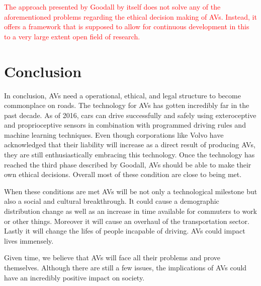\documentclass[11pt]{article}
\newcommand{\changed}[1]{\textcolor{red}{#1}}
\begin{document}
\changed{The approach presented by Goodall by itself does not solve any of the aforementioned problems regarding the ethical decision making of AVs. Instead, it offers a framework that is supposed to allow for continuous development in this to a very large extent open field of research. }

\section{Conclusion}
In conclusion, AVs need a operational, ethical, and legal structure to become commonplace on roads. The technology for AVs has gotten incredibly far in the past decade. As of 2016, cars can drive successfully and safely using exteroceptive and proprioceptive sensors in combination with programmed driving rules and machine learning techniques. Even though corporations like Volvo have acknowledged that their liability will increase as a direct result of producing AVs, they are still enthusiastically embracing this technology. Once the technology has reached the third phase described by Goodall, AVs should be able to make their own ethical decisions. Overall most of these condition are close to being met. 

When these conditions are met AVs will be not only a technological milestone but also a social and cultural breakthrough. It could cause a demographic distribution change as well as an increase in time available for commuters to work or other things. Moreover it will cause an overhaul of the transportation sector. Lastly it will change the lifes of people incapable of driving. AVs could impact lives immensely. 

Given time, we believe that AVs will face all their problems and prove themselves. Although there are still a few issues, the implications of AVs could have an incredibly positive impact on society. 



%

\end{document}

